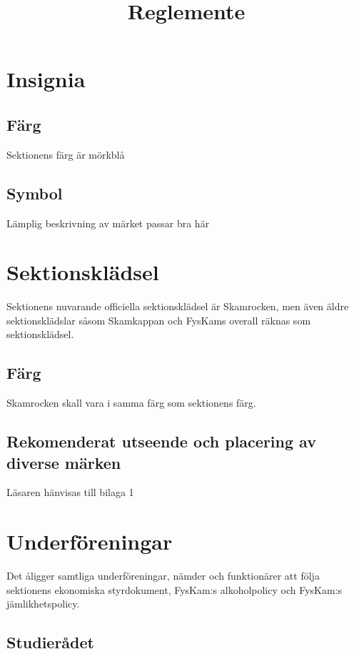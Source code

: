 \documentclass{../resources/dgovdoc}
\title{Reglemente}
\begin{document}
\maketitle

\section{Insignia}

\subsection{Färg}

Sektionens färg är mörkblå

\subsection{Symbol}

Lämplig beskrivning av märket passar bra här

\section{Sektionsklädsel}

Sektionens nuvarande officiella sektionsklädsel är Skamrocken, men även äldre sektionsklädslar såsom Skamkappan och FysKams overall
räknas som sektionsklädsel.

\subsection{Färg}

Skamrocken skall vara i samma färg som sektionens färg.

\subsection{Rekomenderat utseende och placering av diverse märken}

Läsaren hänvisas till bilaga 1

\section{Underföreningar}

Det åligger samtliga underföreningar, nämder och funktionärer att följa sektionens ekonomiska styrdokument,
FysKam:s alkoholpolicy och FysKam:s jämlikhetspolicy. 

\subsection{Studierådet}
\end{document}

